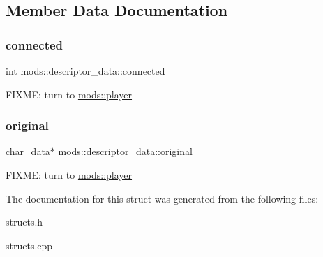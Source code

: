 \subsection{Member Data Documentation}
\mbox{\label{structmods_1_1descriptor__data_a6842b716dcb3f1b7874d3c5c2dd4c2df}} 
\subsubsection{\texorpdfstring{connected}{connected}}
{\footnotesize\ttfamily int mods\+::descriptor\+\_\+data\+::connected}

F\+I\+X\+ME\+: turn to \hyperlink{classmods_1_1player}{mods\+::player} \mbox{\label{structmods_1_1descriptor__data_a0aafac1b6c34958e9e214f941ea2afdc}} 
\subsubsection{\texorpdfstring{original}{original}}
{\footnotesize\ttfamily \hyperlink{structchar__data}{char\+\_\+data}$\ast$ mods\+::descriptor\+\_\+data\+::original}

F\+I\+X\+ME\+: turn to \hyperlink{classmods_1_1player}{mods\+::player} 

The documentation for this struct was generated from the following files\+:\begin{DoxyCompactItemize}
\item 
structs.\+h\item 
structs.\+cpp\end{DoxyCompactItemize}
